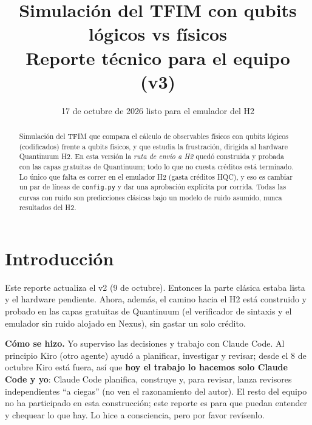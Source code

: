 \documentclass[11pt,a4paper]{article}
\title{\textbf{Simulaci\'on del TFIM con qubits l\'ogicos vs f\'isicos}\\[0.3em]
\large Reporte t\'ecnico para el equipo (v3)}
\author{}
\date{17 de octubre de 2026 \quad\textbullet\quad listo para el emulador del H2}
\begin{document}
\maketitle

\begin{abstract}
\noindent Simulaci\'on del TFIM que compara el c\'alculo de observables f\'isicos con qubits l\'ogicos
(codificados) frente a qubits f\'isicos, y que estudia la frustraci\'on, dirigida al hardware
Quantinuum H2. En esta versi\'on la \emph{ruta de env\'io a H2} qued\'o construida y probada con las
capas gratuitas de Quantinuum; todo lo que no cuesta cr\'editos est\'a terminado. Lo \'unico que falta
es correr en el emulador H2 (gasta cr\'editos HQC), y eso es cambiar un par de l\'ineas de
\texttt{config.py} y dar una aprobaci\'on expl\'icita por corrida. Todas las curvas con ruido son
predicciones cl\'asicas bajo un modelo de ruido asumido, nunca resultados del H2.
\end{abstract}

\tableofcontents

\section{Introducci\'on}

Este reporte actualiza el v2 (9 de octubre). Entonces la parte cl\'asica estaba lista y el hardware
pendiente. Ahora, adem\'as, el camino hacia el H2 est\'a construido y probado en las capas
gratuitas de Quantinuum (el verificador de sintaxis y el emulador sin ruido alojado en Nexus), sin
gastar un solo cr\'edito.

\textbf{C\'omo se hizo.} Yo superviso las decisiones y trabajo con Claude Code. Al principio Kiro
(otro agente) ayud\'o a planificar, investigar y revisar; desde el 8 de octubre Kiro est\'a fuera, as\'i
que \textbf{hoy el trabajo lo hacemos solo Claude Code y yo}: Claude Code planifica, construye y, para
revisar, lanza revisores independientes ``a ciegas'' (no ven el razonamiento del autor). El resto del
equipo no ha participado en esta construcci\'on; este reporte es para que puedan entender y chequear lo
que hay. Lo hice a consciencia, pero por favor rev\'isenlo.
\end{document}
